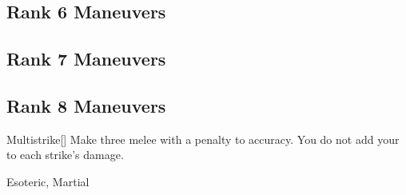 \subsection{Rank 6 Maneuvers}
\subsection{Rank 7 Maneuvers}
\subsection{Rank 8 Maneuvers}

\lowercase{\hypertarget{maneuver:Multistrike}{}}\label{maneuver:Multistrike}
\hypertarget{maneuver:Multistrike}{}
\begin{freeability}[Rank 8]{Multistrike}[]
Make three melee  with a  penalty to accuracy.
You do not add your  to each strike's damage.


 Esoteric, Martial
\end{freeability}
\vspace{0.25em}

